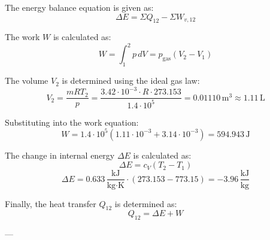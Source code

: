 The energy balance equation is given as:  
\[
\Delta E = \Sigma Q_{12} - \Sigma W_{v,12}
\]  

The work \( W \) is calculated as:  
\[
W = \int_{1}^{2} p \, dV = p_{\text{gas}} (V_2 - V_1)
\]  

The volume \( V_2 \) is determined using the ideal gas law:  
\[
V_2 = \frac{mRT_2}{p} = \frac{3.42 \cdot 10^{-3} \cdot R \cdot 273.153}{1.4 \cdot 10^5} = 0.01110 \, \text{m}^3 \approx 1.11 \, \text{L}
\]  

Substituting into the work equation:  
\[
W = 1.4 \cdot 10^5 \left( 1.11 \cdot 10^{-3} + 3.14 \cdot 10^{-3} \right) = 594.943 \, \text{J}
\]  

The change in internal energy \( \Delta E \) is calculated as:  
\[
\Delta E = c_V (T_2 - T_1)
\]  
\[
\Delta E = 0.633 \, \frac{\text{kJ}}{\text{kg·K}} \cdot (273.153 - 773.15) = -3.96 \, \frac{\text{kJ}}{\text{kg}}
\]  

Finally, the heat transfer \( Q_{12} \) is determined as:  
\[
Q_{12} = \Delta E + W
\]  

---